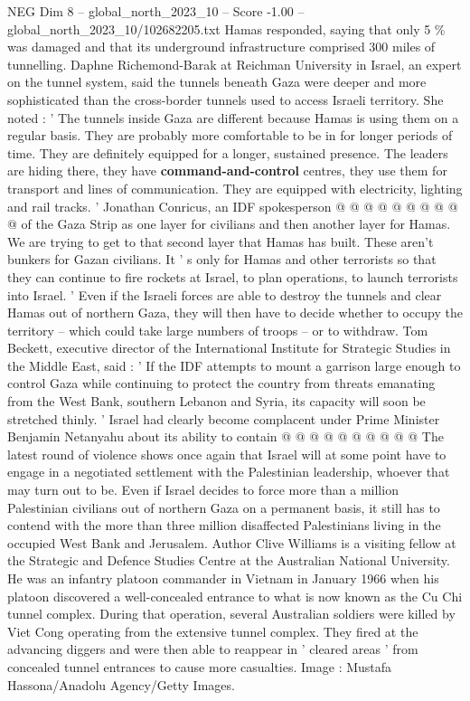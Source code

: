 \begin{textsample}{NEG Dim 8 – global\_north\_2023\_10 – Score -1.00 – global\_north\_2023\_10/102682205.txt}
Hamas responded, saying that only 5 \% was damaged and that its underground infrastructure comprised 300 miles of tunnelling.
Daphne Richemond-Barak at Reichman University in Israel, an expert on the tunnel system, said the tunnels beneath Gaza were deeper and more sophisticated than the cross-border tunnels used to access Israeli territory.
She noted : ' The tunnels inside Gaza are different because Hamas is using them on a regular basis.
They are probably more comfortable to be in for longer periods of time.
They are definitely equipped for a longer, sustained presence.
The leaders are hiding there, they have \textbf{command-and-control} centres, they use them for transport and lines of communication.
They are equipped with electricity, lighting and rail tracks. ' Jonathan Conricus, an IDF spokesperson @ @ @ @ @ @ @ @ @ @ of the Gaza Strip as one layer for civilians and then another layer for Hamas.
We are trying to get to that second layer that Hamas has built.
These aren't bunkers for Gazan civilians.
It ' s only for Hamas and other terrorists so that they can continue to fire rockets at Israel, to plan operations, to launch terrorists into Israel. ' Even if the Israeli forces are able to destroy the tunnels and clear Hamas out of northern Gaza, they will then have to decide whether to occupy the territory -- which could take large numbers of troops -- or to withdraw.
Tom Beckett, executive director of the International Institute for Strategic Studies in the Middle East, said : ' If the IDF attempts to mount a garrison large enough to control Gaza while continuing to protect the country from threats emanating from the West Bank, southern Lebanon and Syria, its capacity will soon be stretched thinly. ' Israel had clearly become complacent under Prime Minister Benjamin Netanyahu about its ability to contain @ @ @ @ @ @ @ @ @ @ The latest round of violence shows once again that Israel will at some point have to engage in a negotiated settlement with the Palestinian leadership, whoever that may turn out to be.
Even if Israel decides to force more than a million Palestinian civilians out of northern Gaza on a permanent basis, it still has to contend with the more than three million disaffected Palestinians living in the occupied West Bank and Jerusalem.
Author Clive Williams is a visiting fellow at the Strategic and Defence Studies Centre at the Australian National University.
He was an infantry platoon commander in Vietnam in January 1966 when his platoon discovered a well-concealed entrance to what is now known as the Cu Chi tunnel complex.
During that operation, several Australian soldiers were killed by Viet Cong operating from the extensive tunnel complex.
They fired at the advancing diggers and were then able to reappear in ' cleared areas ' from concealed tunnel entrances to cause more casualties.
Image : Mustafa Hassona/Anadolu Agency/Getty Images.

\end{textsample}
